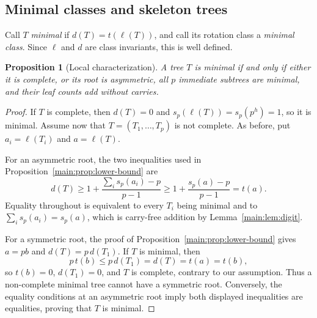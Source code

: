 \documentclass[11pt]{article}
\newtheorem{proposition}[theorem]{Proposition}
\theoremstyle{definition}
\theoremstyle{remark}
\numberwithin{equation}{section}
\numberwithin{figure}{section}
\begin{document}
\subsection{Minimal classes and skeleton trees}
Call $T$ \emph{minimal} if $d(T)=t(\ell(T))$, and call its rotation class a \emph{minimal class}.  Since $\ell$ and $d$ are class invariants, this is well defined.
\begin{proposition}[Local characterization]\label{main:prop:minimal-local}
A tree $T$ is minimal if and only if either it is complete, or its root is asymmetric, all $p$ immediate subtrees are minimal, and their leaf counts add without carries.
\end{proposition}
\begin{proof}
If $T$ is complete, then $d(T)=0$ and $s_p(\ell(T))=s_p(p^h)=1$, so it is minimal.  Assume now that $T=(T_1,\ldots,T_p)$ is not complete.  As before, put $a_i=\ell(T_i)$ and $a=\ell(T)$.

For an asymmetric root, the two inequalities used in Proposition~\ref{main:prop:lower-bound} are
\[
 d(T)\ge1+\frac{\sum_is_p(a_i)-p}{p-1}
 \ge1+\frac{s_p(a)-p}{p-1}=t(a).
\]
Equality throughout is equivalent to every $T_i$ being minimal and to $\sum_is_p(a_i)=s_p(a)$, which is carry-free addition by Lemma~\ref{main:lem:digit}.

For a symmetric root, the proof of Proposition~\ref{main:prop:lower-bound} gives $a=pb$ and $d(T)=p\,d(T_1)$.  If $T$ is minimal, then
\[
 p\,t(b)\le p\,d(T_1)=d(T)=t(a)=t(b),
\]
so $t(b)=0$, $d(T_1)=0$, and $T$ is complete, contrary to our assumption.  Thus a non-complete minimal tree cannot have a symmetric root.  Conversely, the equality conditions at an asymmetric root imply both displayed inequalities are equalities, proving that $T$ is minimal.
\end{proof}
\end{document}
